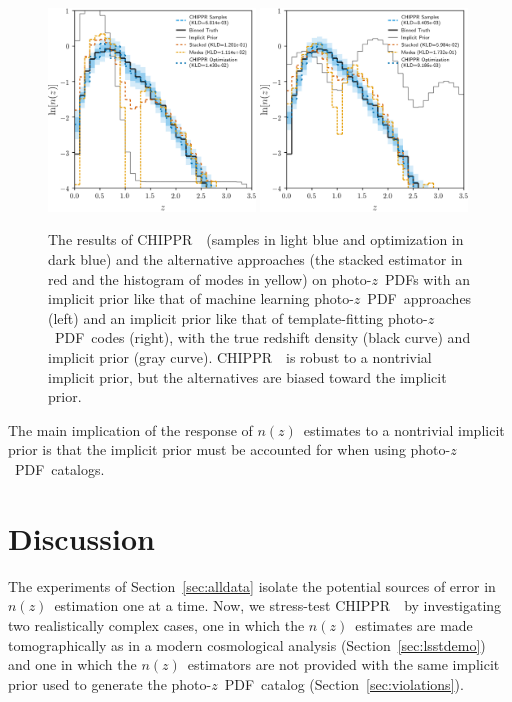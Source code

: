 \documentclass[iop]{emulateapj}
\newcommand{\Sect}[1]{Section~\ref{#1}}
\newcommand{\project}[1]{{\textsc{#1}}~}
\newcommand{\Chippr}{\project{CHIPPR}}
\newcommand{\nz}{$n(z)$}
\newcommand{\pz}{photo-$z$~}
\newcommand{\pzpdf}{\pz PDF}
\begin{document}
\begin{figure}
	\includegraphics[width=0.49\textwidth]{figures/chippr/results_trpr.png}
	\includegraphics[width=0.49\textwidth]{figures/chippr/results_tmpr.png}
	\caption{
		The results of \Chippr\ (samples in light blue and optimization 
in dark blue) and the alternative approaches (the stacked estimator in red and 
the histogram of modes in yellow) on \pzpdf s with an implicit prior like that 
of machine learning \pzpdf\ approaches (left) and an implicit prior like that 
of template-fitting \pzpdf\ codes (right), with the true redshift density 
(black curve) and implicit prior (gray curve).
		\Chippr\ is robust to a nontrivial implicit prior, but the 
alternatives are biased toward the implicit prior.
	}
	\label{fig:results-priors}
\end{figure}


The main implication of the response of \nz\ estimates to a nontrivial implicit 
prior is that the implicit prior must be accounted for when using \pzpdf\ 
catalogs.

\section{Discussion}
\label{sec:results}

The experiments of \Sect{sec:alldata} isolate the potential sources of error in 
\nz\ estimation one at a time.
Now, we stress-test \Chippr\ by investigating two realistically complex cases, 
one in which the \nz\ estimates are made tomographically as in a modern 
cosmological analysis (\Sect{sec:lsstdemo}) and one in which the \nz\ 
estimators are not provided with the same implicit prior used to generate the 
\pzpdf\ catalog (\Sect{sec:violations}).
\end{document}
